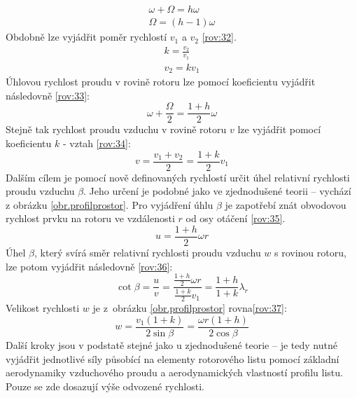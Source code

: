 		\begin{eqnarray}
			\label{rov:31}
			\omega + \Omega = h\omega \nonumber \\
			\Omega = (h-1)\omega
		\end{eqnarray}
	Obdobně lze vyjádřit poměr rychlostí $v_1$ a $v_2$ \eqref{rov:32}\cite{Rychetnik:Motory}.
	\begin{eqnarray}
				\label{rov:32}
				k = \frac{v_2}{v_1} \nonumber \\
				v_2 = kv_1
	\end{eqnarray}
	Úhlovou rychlost proudu v rovině rotoru lze pomocí koeficientu vyjádřit následovně \eqref{rov:33}\cite{Rychetnik:Motory}:
	\begin{equation}
		\label{rov:33}
		\omega + \frac{\Omega}{2}=\frac{1+h}{2}\omega
	\end{equation}
	Stejně tak rychlost proudu vzduchu v rovině rotoru $v$ lze vyjádřit pomocí koeficientu $k$ - vztah \eqref{rov:34}\cite{Rychetnik:Motory}:
	\begin{equation}
			\label{rov:34}
			v =\frac{v_1 + v_2}{2}=\frac{1+k}{2}v_1
	\end{equation}
	Dalším cílem je pomocí nově definovaných rychlostí určit úhel relativní rychlosti proudu vzduchu $\beta$. Jeho určení je podobné jako ve zjednodušené teorii – vychází z obrázku \ref{obr.profilprostor}.
	Pro vyjádření úhlu $\beta$ je zapotřebí znát obvodovou rychlost prvku na rotoru ve vzdálenosti $r$ od osy otáčení \eqref{rov:35}\cite{Rychetnik:Motory}.
	\begin{equation}
		\label{rov:35}
		u =\frac{1+h}{2}\omega r
		\end{equation}
	Úhel $\beta$, který svírá směr relativní rychlosti proudu vzduchu $w$ s rovinou rotoru, lze potom vyjádřit následovně \eqref{rov:36}\cite{Rychetnik:Motory}:
	\begin{equation}
			\label{rov:36}
			\cot \beta = \frac{u}{v}=\frac{\frac{1+h}{2}\omega r}{\frac{1+k}{2}v_1}=\frac{1+h}{1+k}\lambda_r
	\end{equation}
	Velikost rychlosti $w$ je z~obrázku \ref{obr.profilprostor} rovna\eqref{rov:37}\cite{Rychetnik:Motory}:
	\begin{equation}
		\label{rov:37}
		w=\frac{v_1 (1+k)}{2\sin\beta}=\frac{\omega r(1+h)}{2\cos\beta}
	\end{equation}
	Další kroky jsou v podstatě stejné jako u zjednodušené teorie – je tedy nutné vyjádřit jednotlivé síly působící na elementy rotorového listu pomocí základní aerodynamiky vzduchového proudu a aerodynamických vlastností profilu listu. Pouze se zde dosazují výše odvozené rychlosti.
	

